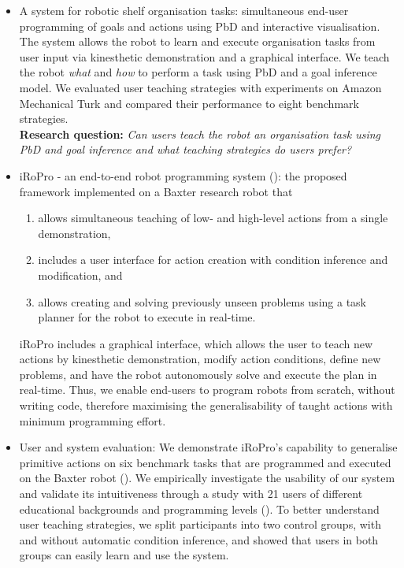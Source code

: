 \begin{itemize}
	\item {A system for robotic shelf organisation tasks: simultaneous end-user programming of goals and actions using PbD and interactive visualisation. %
		The system allows the robot to learn and execute organisation tasks from user input via kinesthetic demonstration and a graphical interface.
		We teach the robot \textit{what} and \textit{how} to perform a task using PbD and a goal inference model.
		We evaluated user teaching strategies with experiments on Amazon Mechanical Turk and compared their performance to eight benchmark strategies.\\
		\textbf{Research question:} \textit{Can users teach the robot an organisation task using PbD and goal inference and what teaching strategies do users prefer?}}

	\item {iRoPro - an end-to-end robot programming system (\cite{liang2018simultaneous}): the proposed framework implemented on a Baxter research robot that 
		\begin{enumerate}
			\item allows simultaneous teaching of low- and high-level actions from a single demonstration, 
			\item includes a user interface for action creation with condition inference and modification, and
			\item allows creating and solving previously unseen problems using a task planner for the robot to execute in real-time.
		\end{enumerate}
	iRoPro includes a graphical interface, which allows the user to teach new actions by kinesthetic demonstration, modify action conditions, define new problems, and have the robot autonomously solve and execute the plan in real-time.
	Thus, we enable end-users to program robots from scratch, without writing code, therefore maximising the generalisability of taught actions with minimum programming effort.}

	\item {User and system evaluation:
	We demonstrate iRoPro's capability to generalise primitive actions on six benchmark tasks that are programmed and executed on the Baxter robot ().
	We empirically investigate the usability of our system and validate its intuitiveness through a study with 21 users of different educational backgrounds and programming levels
	().
	To better understand user teaching strategies, we split participants into two control groups, with and without automatic condition inference, and showed that users in both groups can easily learn and use the system.}
	
	
\end{itemize}
